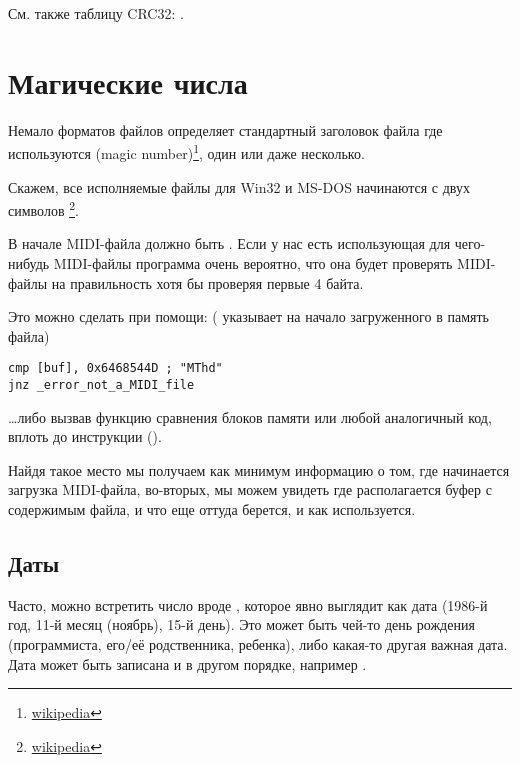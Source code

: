 См. также таблицу CRC32: .

\section{Магические числа}

\newcommand{\FNURLMAGIC}{\footnote{\href{http://go.yurichev.com/17112}{wikipedia}}}

Немало форматов файлов определяет стандартный заголовок файла где используются  (magic number)\FNURLMAGIC{}, один или даже несколько.

Скажем, все исполняемые файлы для Win32 и MS-DOS начинаются с двух символов \footnote{\href{http://go.yurichev.com/17113}{wikipedia}}.

В начале MIDI-файла должно быть . Если у нас есть использующая для чего-нибудь MIDI-файлы программа
очень вероятно, что она будет проверять MIDI-файлы на правильность хотя бы проверяя первые 4 байта.

Это можно сделать при помощи:
( указывает на начало загруженного в память файла)

\begin{lstlisting}
cmp [buf], 0x6468544D ; "MThd"
jnz _error_not_a_MIDI_file
\end{lstlisting}

\dots либо вызвав функцию сравнения блоков памяти  или любой аналогичный код, 
вплоть до инструкции  ().

Найдя такое место мы получаем как минимум информацию о том, где начинается загрузка MIDI-файла, во-вторых, 
мы можем увидеть где располагается буфер с содержимым файла, и что еще оттуда берется, и как используется.

\subsection{Даты}


Часто, можно встретить число вроде , которое явно выглядит как дата (1986-й год, 11-й месяц (ноябрь), 15-й день).
Это может быть чей-то день рождения (программиста, его/её родственника, ребенка), либо какая-то другая важная дата.
Дата может быть записана и в другом порядке, например .

